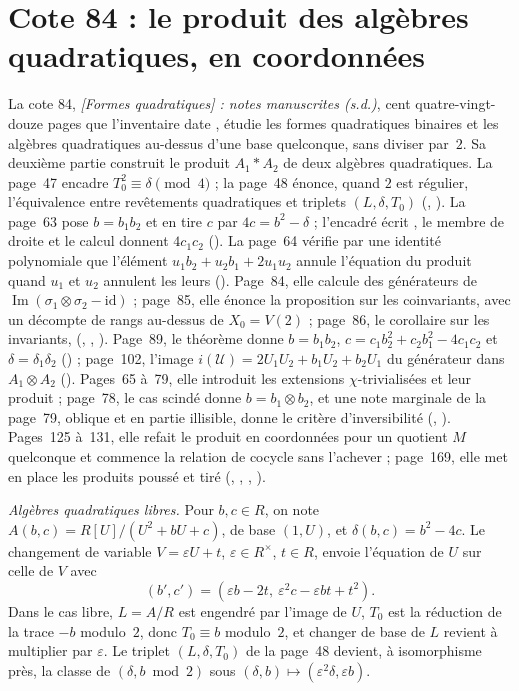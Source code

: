 \section[Cote 84 : le produit des algèbres quadratiques, en coordonnées]{Cote 84 : le produit des algèbres quadratiques, en coordonnées\protect{}}\label{sec:84}

La cote 84, \emph{[Formes quadratiques] : notes manuscrites (s.d.)}, cent quatre-vingt-douze pages que l'inventaire date , étudie les formes quadratiques binaires et les algèbres quadratiques au-dessus d'une base quelconque, sans diviser par~$2$. Sa deuxième partie construit le produit $A_1 * A_2$ de deux algèbres quadratiques. La page~47 encadre $T_0^2 \equiv \delta \pmod 4$ ; la page~48 énonce, quand $2$ est régulier, l'équivalence entre revêtements quadratiques et triplets $(L, \delta, T_0)$ (, ). La page~63 pose  $b = b_1b_2$ et en tire $c$ par $4c = b^2 - \delta$ ; l'encadré écrit , le membre de droite et le calcul donnent $4c_1c_2$ (). La page~64 vérifie par une identité polynomiale que l'élément $u_1b_2 + u_2b_1 + 2u_1u_2$ annule l'équation du produit quand $u_1$ et $u_2$ annulent les leurs (). Page~84, elle calcule des générateurs de $\operatorname{Im}(\sigma_1 \otimes \sigma_2 - \mathrm{id})$ ; page~85, elle énonce la proposition sur les coinvariants, avec un décompte de rangs au-dessus de $X_0 = V(2)$ ; page~86, le corollaire sur les invariants,  (, , ). Page~89, le théorème donne $b = b_1b_2$, $c = c_1b_2^2 + c_2b_1^2 - 4c_1c_2$ et $\delta = \delta_1\delta_2$ () ; page~102, l'image $i(\mathcal U) = 2U_1U_2 + b_1U_2 + b_2U_1$ du générateur dans $A_1 \otimes A_2$ (). Pages~65 à~79, elle introduit les extensions $\chi$-trivialisées et leur produit ; page~78, le cas scindé donne $b = b_1 \otimes b_2$, et une note marginale de la page~79, oblique et en partie illisible, donne le critère d'inversibilité (, ). Pages~125 à~131, elle refait le produit en coordonnées pour un quotient $M$ quelconque et commence la relation de cocycle sans l'achever ; page~169, elle met en place les produits poussé et tiré (, , , ).

\noindent\emph{Algèbres quadratiques libres.} Pour $b, c \in R$, on note $A(b, c) = R[U]/(U^2 + bU + c)$, de base $(1, U)$, et $\delta(b, c) = b^2 - 4c$. Le changement de variable $V = \varepsilon U + t$, $\varepsilon \in R^\times$, $t \in R$, envoie l'équation de $U$ sur celle de $V$ avec
\[ (b', c') = (\varepsilon b - 2t,\ \varepsilon^2c - \varepsilon bt + t^2). \]
Dans le cas libre, $L = A/R$ est engendré par l'image de $U$, $T_0$ est la réduction de la trace $-b$ modulo~$2$, donc $T_0 \equiv b$ modulo~$2$, et changer de base de $L$ revient à multiplier par $\varepsilon$. Le triplet $(L, \delta, T_0)$ de la page~48 devient, à isomorphisme près, la classe de $(\delta, b \bmod 2)$ sous $(\delta, b) \mapsto (\varepsilon^2\delta, \varepsilon b)$.

